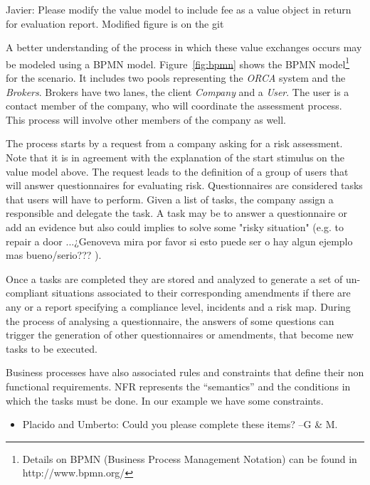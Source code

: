 {\color{blue} Javier: Please modify the value model to include fee as a value object in return for evaluation report. Modified figure is on the git}

A better understanding of the process in which these value exchanges occurs may be modeled using a BPMN model. Figure~\ref{fig:bpmn} shows the BPMN model\footnote{Details on BPMN (Business Process Management Notation) can be found in http://www.bpmn.org/} for the scenario. It includes two pools representing the \textsl{ORCA} system and the \textsl{Brokers}. Brokers have two lanes, the client \textsl{Company} and a \textsl{User}. The user is a contact member of the company, who will coordinate the assessment process. This process will involve other members of the company as well.

The process starts by a request from a company asking for a risk assessment. Note that it is in agreement with the explanation of the start stimulus on the value model above. The request leads to the definition of a group of users that will answer questionnaires for evaluating risk. Questionnaires are considered tasks that users will have to perform. Given a list of tasks, the company assign a responsible and delegate the task. A task may be to answer a questionnaire or add an evidence but also could implies to solve some "risky situation" (e.g. to repair a door {\color{blue} ...¿Genoveva mira por favor si esto puede ser o hay algun ejemplo mas bueno/serio???} ).

Once a tasks are completed they are stored and analyzed to generate a set of un-compliant situations associated to their corresponding amendments if there are any or a report specifying a compliance level, incidents and a risk map.
During the process of analysing a questionnaire, the answers of some questions can trigger the generation of other questionnaires or amendments, that become new tasks to be executed.  

Business processes have also associated rules and constraints that define their non functional requirements.
NFR represents the ``semantics'' and the conditions in which the tasks must be done.
In our example we have some constraints.
\begin{itemize}
\item {\color{magenta} Placido and Umberto: Could you please complete these items? --G \& M.}
\end{itemize}

